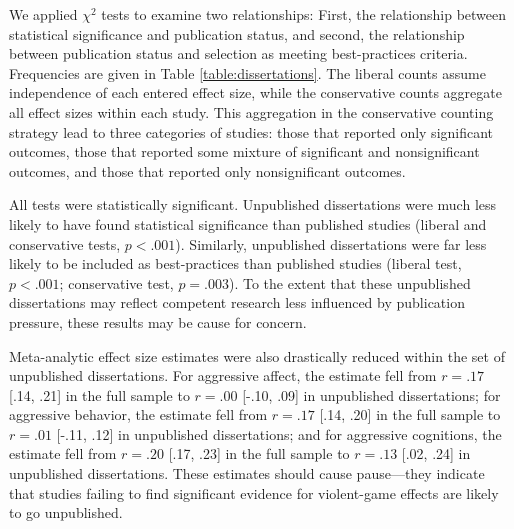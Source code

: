 \documentclass[man, mask]{apa6}
\begin{document}
We applied $\chi^2$ tests to examine two relationships: First, the relationship between statistical significance and publication status, and second, the relationship between publication status and selection as meeting best-practices criteria. Frequencies are given in Table \ref{table:dissertations}. The liberal counts assume independence of each entered effect size, while the conservative counts aggregate all effect sizes within each study. This aggregation in the conservative counting strategy lead to three categories of studies: those that reported only significant outcomes, those that reported some mixture of significant and nonsignificant outcomes, and those that reported only nonsignificant outcomes.

All tests were statistically significant. Unpublished dissertations were much less likely to have found statistical significance than published studies (liberal and conservative tests, $p < .001$).
Similarly, unpublished dissertations were far less likely to be included as best-practices than published studies (liberal test, $p < .001$; conservative test, $p = .003$). 
To the extent that these unpublished dissertations may reflect competent research less influenced by publication pressure, these results may be cause for concern.

Meta-analytic effect size estimates were also drastically reduced within the set of unpublished dissertations. For aggressive affect, the estimate fell from $r = .17$ [.14, .21] in the full sample to $r = .00$ [-.10, .09] in unpublished dissertations; for aggressive behavior, the estimate fell from $r = .17$ [.14, .20] in the full sample to $r = .01$ [-.11, .12] in unpublished dissertations; and for aggressive cognitions, the estimate fell from $r = .20$ [.17, .23] in the full sample to $r =  .13$ [.02, .24] in unpublished dissertations.  These estimates should cause pause---they indicate that studies failing to find significant evidence for violent-game effects are likely to go unpublished.
\end{document}
